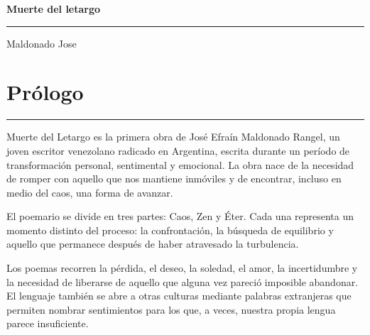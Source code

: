 \documentclass[12pt,oneside,a5paper]{book}
\begin{document}
\begin{titlepage}
    \color{white}
    \centering
    \vspace*{\fill}
    {\Huge \bfseries Muerte del letargo \par}
    \vspace{0.5em}
    {\color{white}\rule{0.7\textwidth}{0.4pt}} \par
    \vspace{2cm}
    {\Large Maldonado Jose \par}
    \vspace*{\fill}
\end{titlepage}
\restorepagecolor
\color{black}

\clearpage
\tableofcontents
\clearpage

\chapter*{Prólogo}
\vspace{-0.5em}
{\color{black}\rule{\textwidth}{0.4pt}} \par \vspace{0.8em}

Muerte del Letargo es la primera obra de José Efraín Maldonado Rangel, un joven escritor venezolano radicado en Argentina, escrita durante un período de transformación personal, sentimental y emocional. La obra nace de la necesidad de romper con aquello que nos mantiene inmóviles y de encontrar, incluso en medio del caos, una forma de avanzar.

El poemario se divide en tres partes: Caos, Zen y Éter. Cada una representa un momento distinto del proceso: la confrontación, la búsqueda de equilibrio y aquello que permanece después de haber atravesado la turbulencia.

Los poemas recorren la pérdida, el deseo, la soledad, el amor, la incertidumbre y la necesidad de liberarse de aquello que alguna vez pareció imposible abandonar. El lenguaje también se abre a otras culturas mediante palabras extranjeras que permiten nombrar sentimientos para los que, a veces, nuestra propia lengua parece insuficiente.
\end{document}
